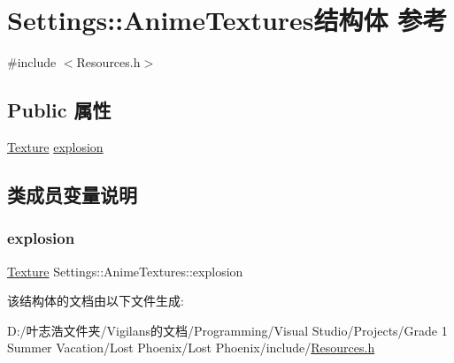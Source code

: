 \hypertarget{struct_settings_1_1_anime_textures}{}\section{Settings\+:\+:Anime\+Textures结构体 参考}
\label{struct_settings_1_1_anime_textures}


{\ttfamily \#include $<$Resources.\+h$>$}

\subsection*{Public 属性}
\begin{DoxyCompactItemize}
\item 
\hyperlink{struct_texture}{Texture} \hyperlink{struct_settings_1_1_anime_textures_ac7d7f8216a2c1f3f06dfcb59d6ed7a10}{explosion}
\end{DoxyCompactItemize}


\subsection{类成员变量说明}
\mbox{\label{struct_settings_1_1_anime_textures_ac7d7f8216a2c1f3f06dfcb59d6ed7a10}} 
\subsubsection{\texorpdfstring{explosion}{explosion}}
{\footnotesize\ttfamily \hyperlink{struct_texture}{Texture} Settings\+::\+Anime\+Textures\+::explosion}



该结构体的文档由以下文件生成\+:\begin{DoxyCompactItemize}
\item 
D\+:/叶志浩文件夹/\+Vigilans的文档/\+Programming/\+Visual Studio/\+Projects/\+Grade 1 Summer Vacation/\+Lost Phoenix/\+Lost Phoenix/include/\hyperlink{_resources_8h}{Resources.\+h}\end{DoxyCompactItemize}
